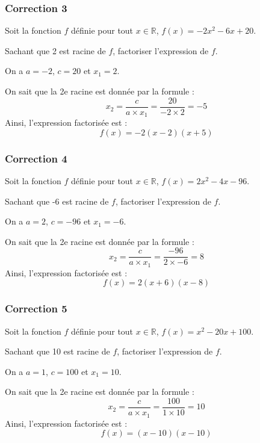 \documentclass[15pt, mathserif]{beamer}
\newcommand{\R}{\mathbb{R}}			%
\begin{document}
\begin{frame}
\vspace{-10mm}
	\frametitle{Correction 3}
Soit la fonction $f$ définie pour tout $x \in \R$, $f(x)=-2x^2-6x+20$. 
 
 Sachant que 2 est racine de $f$, factoriser l'expression de $f$. 
 
 On a $a=-2$, $c=20$ et $x_1=2$. 
 
 On sait que la 2e racine est donnée par la formule : $$x_2=\dfrac{c}{a \times x_1}=\dfrac{20}{-2\times 2}=-5$$ Ainsi, l'expression factorisée est : $$f(x)=-2(x-2)(x+5)$$ 
 \end{frame}


\begin{frame}
\vspace{-10mm}
	\frametitle{Correction 4}
Soit la fonction $f$ définie pour tout $x \in \R$, $f(x)=2x^2-4x-96$. 
 
 Sachant que -6 est racine de $f$, factoriser l'expression de $f$. 
 
 On a $a=2$, $c=-96$ et $x_1=-6$. 
 
 On sait que la 2e racine est donnée par la formule : $$x_2=\dfrac{c}{a \times x_1}=\dfrac{-96}{2\times -6}=8$$ Ainsi, l'expression factorisée est : $$f(x)=2(x+6)(x-8)$$ 
 \end{frame}


\begin{frame}
\vspace{-10mm}
	\frametitle{Correction 5}
Soit la fonction $f$ définie pour tout $x \in \R$, $f(x)=x^2-20x+100$. 
 
 Sachant que 10 est racine de $f$, factoriser l'expression de $f$. 
 
 On a $a=1$, $c=100$ et $x_1=10$. 
 
 On sait que la 2e racine est donnée par la formule : $$x_2=\dfrac{c}{a \times x_1}=\dfrac{100}{1\times 10}=10$$ Ainsi, l'expression factorisée est : $$f(x)=(x-10)(x-10)$$ 
 \end{frame}
\end{document}
